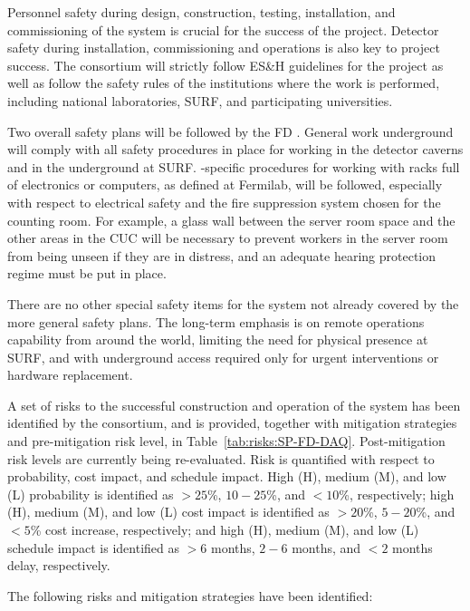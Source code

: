 Personnel safety during design, construction, testing, installation, and
commissioning of the system is crucial for the success of the
project. Detector safety during installation,
commissioning and operations is also key to project success.
The consortium will strictly follow ES\&H guidelines for the
project as well as follow the safety rules of the institutions where
the work is performed, including national laboratories, SURF, and
participating universities.  

Two overall safety plans will be followed by the FD . General work underground will comply
with all safety procedures in place for working in the detector
caverns and in the  underground at
SURF. -specific procedures for working with racks full of
electronics or computers, as defined 
at Fermilab, will be followed, especially with respect to electrical safety and the fire suppression
system chosen for the counting room. For example, a glass wall between the server room space and
the other areas in the CUC will be necessary to prevent workers in the server room from being
unseen if they are in distress, and an adequate hearing protection
regime must be put in place.

There are no other special safety items for the  system not already covered by the more general safety plans. The long-term emphasis is on remote operations capability from around the world, limiting the need for physical presence at SURF, and with underground access required only for urgent interventions or hardware replacement. 

A set of risks to the successful construction and operation of the  system has been
identified by the consortium, and is provided,
together with mitigation strategies and pre-mitigation risk level, 
in Table~\ref{tab:risks:SP-FD-DAQ}. Post-mitigation risk levels are
currently being re-evaluated. Risk is quantified with respect to
probability, cost impact, and schedule impact. High (H), medium (M), and low (L)
probability is identified as
$>25$\%, $10-25$\%, and $<10$\%, respectively; high (H), medium (M), and low (L)
cost impact is identified as
$>20$\%, $5-20$\%, and $<5$\% cost increase, respectively; and high
(H), medium (M), and low (L) schedule impact is identified as 
$>6$ months, $2-6$ months, and $<2$ months delay, respectively.



The following risks and mitigation strategies have been identified:

